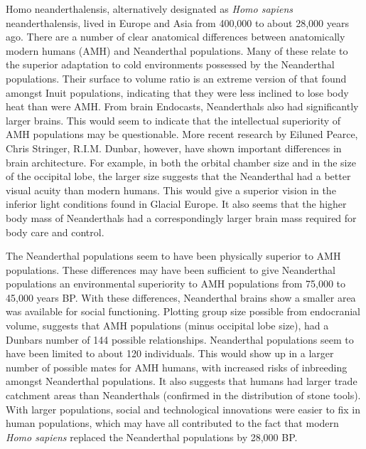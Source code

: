 Homo neanderthalensis, alternatively designated as \emph{Homo sapiens} neanderthalensis, lived in Europe and Asia from 400,000 to about 28,000 years ago. There are a number of clear anatomical differences between anatomically modern humans (AMH) and Neanderthal populations. Many of these relate to the superior adaptation to cold environments possessed by the Neanderthal populations. Their surface to volume ratio is an extreme version of that found amongst Inuit populations, indicating that they were less inclined to lose body heat than were AMH. From brain Endocasts, Neanderthals also had significantly larger brains. This would seem to indicate that the intellectual superiority of AMH populations may be questionable. More recent research by Eiluned Pearce, Chris Stringer, R.I.M. Dunbar, however, have shown important differences in brain architecture. For example, in both the orbital chamber size and in the size of the occipital lobe, the larger size suggests that the Neanderthal had a better visual acuity than modern humans. This would give a superior vision in the inferior light conditions found in Glacial Europe. It also seems that the higher body mass of Neanderthals had a correspondingly larger brain mass required for body care and control.

The Neanderthal populations seem to have been physically superior to AMH populations. These differences may have been sufficient to give Neanderthal populations an environmental superiority to AMH populations from 75,000 to 45,000 years BP. With these differences, Neanderthal brains show a smaller area was available for social functioning. Plotting group size possible from endocranial volume, suggests that AMH populations (minus occipital lobe size), had a Dunbars number of 144 possible relationships. Neanderthal populations seem to have been limited to about 120 individuals. This would show up in a larger number of possible mates for AMH humans, with increased risks of inbreeding amongst Neanderthal populations. It also suggests that humans had larger trade catchment areas than Neanderthals (confirmed in the distribution of stone tools). With larger populations, social and technological innovations were easier to fix in human populations, which may have all contributed to the fact that modern \emph{Homo sapiens} replaced the Neanderthal populations by 28,000 BP.


